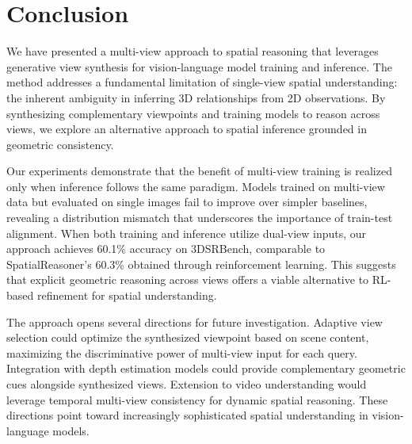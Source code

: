 \section{Conclusion}
\label{sec:conclusion}

We have presented a multi-view approach to spatial reasoning that leverages generative view synthesis for vision-language model training and inference. The method addresses a fundamental limitation of single-view spatial understanding: the inherent ambiguity in inferring 3D relationships from 2D observations. By synthesizing complementary viewpoints and training models to reason across views, we explore an alternative approach to spatial inference grounded in geometric consistency.

Our experiments demonstrate that the benefit of multi-view training is realized only when inference follows the same paradigm. Models trained on multi-view data but evaluated on single images fail to improve over simpler baselines, revealing a distribution mismatch that underscores the importance of train-test alignment. When both training and inference utilize dual-view inputs, our approach achieves 60.1\% accuracy on 3DSRBench, comparable to SpatialReasoner's 60.3\% obtained through reinforcement learning. This suggests that explicit geometric reasoning across views offers a viable alternative to RL-based refinement for spatial understanding.

The approach opens several directions for future investigation. Adaptive view selection could optimize the synthesized viewpoint based on scene content, maximizing the discriminative power of multi-view input for each query. Integration with depth estimation models could provide complementary geometric cues alongside synthesized views. Extension to video understanding would leverage temporal multi-view consistency for dynamic spatial reasoning. These directions point toward increasingly sophisticated spatial understanding in vision-language models.
